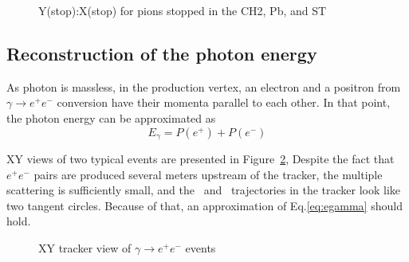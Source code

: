 \begin{figure}[H]
  \caption{
    \label{figure:y_vs_x_st}
    Y(stop):X(stop) for pions stopped in the CH2, Pb, and ST
  }
\end{figure}

\subsection{Reconstruction of the photon energy}

As photon is massless, in the production vertex, an electron and a positron
from $\gamma \to e^+e^-$ conversion have their momenta parallel to each other.
In that point, the photon energy can be approximated as
\begin{equation} \label{eq:egamma}
  E_\gamma = P(e^+) + P(e^-) 
\end{equation}
               
XY views of two typical events are presented in Figure~\ref{figure:rpc07b0s51r0100_xy_view},
Despite the fact that $e^+e^-$ pairs are produced several meters upstream of the tracker,
the multiple scattering is sufficiently small, and the \eplus\ and \eminus\ trajectories
in the tracker look like two tangent circles. Because of that, an approximation of Eq.{\ref{eq:egamma}}
should hold.

\begin{figure}[H]
  \caption{
    \label{figure:rpc07b0s51r0100_xy_view}
    XY tracker view of $\gamma \to e^+e^-$ events
  }
\end{figure}

